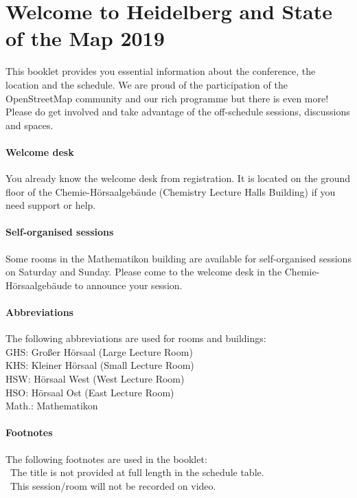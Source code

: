 \newpage
\enlargethispage{1\baselineskip}
\section*{Welcome to Heidelberg and State of the Map 2019} \label{welcome}
This booklet provides you essential information
about the conference, the location and the schedule.  We are proud of the participation of the
OpenStreetMap community and our rich programme but there is even more!  Please do get involved and
take advantage of the off-schedule sessions, discussions and spaces.

\paragraph*{Welcome desk} \label{welcome-helpdesk}
You already know the welcome desk from registration. It is located on the ground floor of the Chemie-Hörsaalgebäude (Chemistry
Lecture Halls Building) if you need support or help.

\paragraph*{Self-organised sessions} \label{welcome-location}
Some rooms in the Mathematikon building are available for self-organised sessions on Saturday and
Sunday. Please come to the welcome desk in the Chemie-Hörsaalgebäude to announce your session.

\paragraph*{Abbreviations}
The following abbreviations are used for rooms and buildings:\\
GHS: Großer Hörsaal (Large Lecture Room)\\
KHS: Kleiner Hörsaal (Small Lecture Room)\\
HSW: Hörsaal West (West Lecture Room)\\
HSO: Hörsaal Ost (East Lecture Room)\\
Math.: Mathematikon


\paragraph*{Footnotes}
The following footnotes are used in the booklet:\\
\diamondSymbol\ The title is not provided at full length in the schedule table.\\
\noVideo\ This session/room will not be recorded on video.

\newpage
